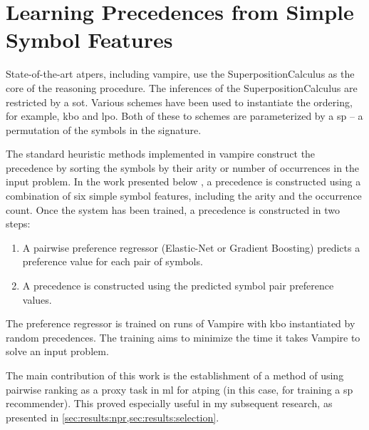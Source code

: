 \newcommand*{\IncludePaper}[2][height=\paperheight-1.5in]{}

\newcommand{\ResultSection}{\chapter}


\ResultSection{Learning Precedences from Simple Symbol Features}
\label{sec:results:simple}

State-of-the-art \glspl{atper}, including \gls{vampire}, use the \gls{SuperpositionCalculus} as the core of the reasoning procedure.
The inferences of the \gls{SuperpositionCalculus} are restricted by a \gls{sot}.
Various schemes have been used to instantiate the ordering,
for example,
\gls{kbo} and \gls{lpo}.
Both of these \gls{to} schemes are parameterized by a \gls{sp} -- a permutation of the symbols in the signature.

The standard heuristic methods implemented in \gls{vampire} construct the \gls{precedence} by sorting the symbols by their arity or number of occurrences in the input problem.
In the work presented below \cite{DBLP:conf/cade/Bartek020},
a \gls{precedence} is constructed using a combination of six simple symbol features,
including the arity and the occurrence count.
Once the system has been trained,
a precedence is constructed in two steps:
\begin{enumerate}
\item A pairwise preference regressor (Elastic-Net or Gradient Boosting) predicts a preference value for each pair of symbols.
\item A precedence is constructed using the predicted symbol pair preference values.
\end{enumerate}
The preference regressor is trained on runs of Vampire with \gls{kbo} instantiated by random precedences.
The training aims to minimize the time it takes Vampire to solve an input problem.

The main contribution of this work is the establishment of a method of using pairwise ranking as a proxy task in \gls{ml} for \gls{atping} (in this case, for training a \gls{sp} recommender).
This proved especially useful in my subsequent research,
as presented in \cref{sec:results:npr,sec:results:selection}.

